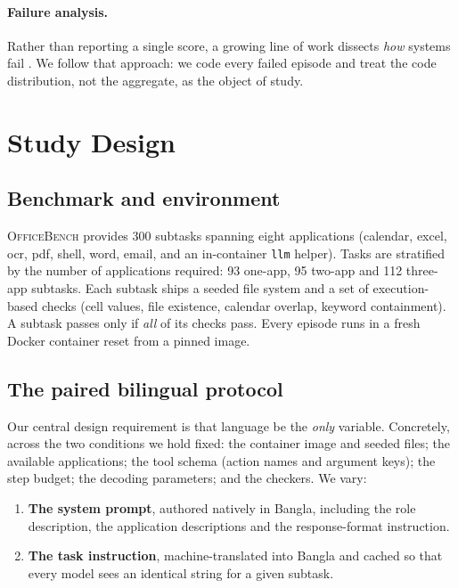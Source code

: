 \documentclass[11pt]{article}
\begin{document}
\paragraph{Failure analysis.} Rather than reporting a single score, a growing line of work
dissects \emph{how} systems fail \citep{bang2023multitask}. We follow that approach: we code
every failed episode and treat the code distribution, not the aggregate, as the object of study.

\section{Study Design}

\subsection{Benchmark and environment}
\textsc{OfficeBench} provides 300 subtasks spanning eight applications (calendar, excel, ocr,
pdf, shell, word, email, and an in-container \texttt{llm} helper). Tasks are stratified by the
number of applications required: 93 one-app, 95 two-app and 112 three-app subtasks. Each
subtask ships a seeded file system and a set of execution-based checks (cell values, file
existence, calendar overlap, keyword containment). A subtask passes only if \emph{all} of its
checks pass. Every episode runs in a fresh Docker container reset from a pinned image.

\subsection{The paired bilingual protocol}
Our central design requirement is that language be the \emph{only} variable. Concretely, across
the two conditions we hold fixed: the container image and seeded files; the available
applications; the tool schema (action names and argument keys); the step budget; the decoding
parameters; and the checkers. We vary:

\begin{enumerate}[noitemsep,topsep=2pt]
\item \textbf{The system prompt}, authored natively in Bangla, including the role description,
the application descriptions and the response-format instruction.
\item \textbf{The task instruction}, machine-translated into Bangla and cached so that every
model sees an identical string for a given subtask.
\end{enumerate}
\end{document}
